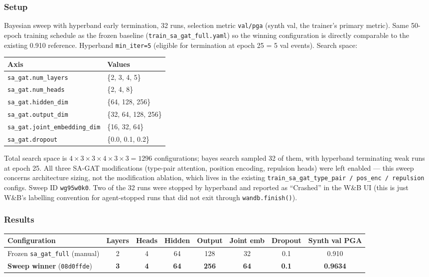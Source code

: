 \subsubsection{Setup}

Bayesian sweep with hyperband early termination, 32 runs, selection metric \texttt{val/pga} (synth val, the trainer's primary metric).
Same 50-epoch training schedule as the frozen baseline (\texttt{train\_sa\_gat\_full.yaml}) so the winning configuration is directly comparable to the existing 0.910 reference.
Hyperband \texttt{min\_iter=5} (eligible for termination at epoch 25 = 5 val events).
Search space:

\begin{tabular}{ll}
\hline
\textbf{Axis} & \textbf{Values} \\
\hline
\texttt{sa\_gat.num\_layers}          & \{2, 3, 4, 5\} \\
\texttt{sa\_gat.num\_heads}           & \{2, 4, 8\} \\
\texttt{sa\_gat.hidden\_dim}          & \{64, 128, 256\} \\
\texttt{sa\_gat.output\_dim}          & \{32, 64, 128, 256\} \\
\texttt{sa\_gat.joint\_embedding\_dim}& \{16, 32, 64\} \\
\texttt{sa\_gat.dropout}              & \{0.0, 0.1, 0.2\} \\
\hline
\end{tabular}

\vspace{0.5em}

Total search space is $4 \times 3 \times 3 \times 4 \times 3 \times 3 = 1296$ configurations; bayes search sampled 32 of them, with hyperband terminating weak runs at epoch 25.
All three SA-GAT modifications (type-pair attention, position encoding, repulsion heads) were left enabled --- this sweep concerns architecture sizing, not the modification ablation, which lives in the existing \texttt{train\_sa\_gat\_type\_pair / pos\_enc / repulsion} configs.
Sweep ID \texttt{wg95w0k0}.
Two of the 32 runs were stopped by hyperband and reported as ``Crashed'' in the W\&B UI (this is just W\&B's labelling convention for agent-stopped runs that did not exit through \texttt{wandb.finish()}).

\subsubsection{Results}

\begin{tabular}{lccccccc}
\hline
\textbf{Configuration} & \textbf{Layers} & \textbf{Heads} & \textbf{Hidden} & \textbf{Output} & \textbf{Joint emb} & \textbf{Dropout} & \textbf{Synth val PGA} \\
\hline
Frozen \texttt{sa\_gat\_full} (manual)         & 2 & 4 & 64  & 128 & 32 & 0.1 & 0.910 \\
\textbf{Sweep winner} (\texttt{08d0ffde})      & \textbf{3} & \textbf{4} & \textbf{64} & \textbf{256} & \textbf{64} & \textbf{0.1} & \textbf{0.9634} \\
\hline
\end{tabular}


